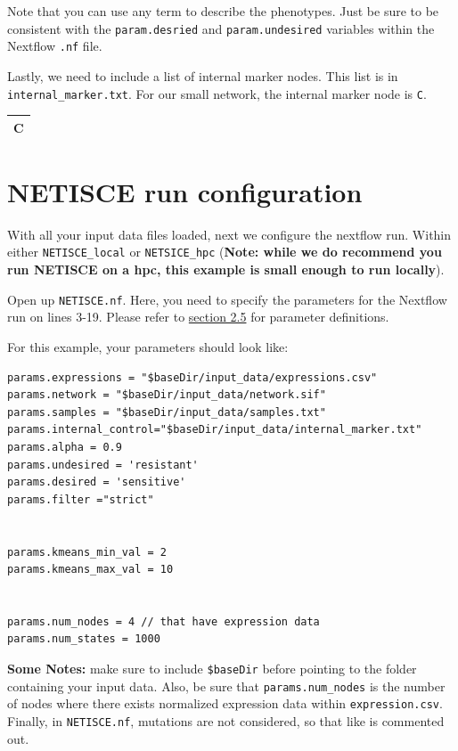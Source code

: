 \documentclass[
]{book}
\begin{document}
Note that you can use any term to describe the phenotypes. Just be sure to be consistent with the \texttt{param.desried} and \texttt{param.undesired} variables within the Nextflow \texttt{.nf} file.

Lastly, we need to include a list of internal marker nodes. This list is in \texttt{internal\_marker.txt}. For our small network, the internal marker node is \texttt{C}.

\begin{tabular}{l}
\hline
C\\


\hline
\end{tabular}

\hypertarget{netisce-run-configuration}{%
\section{NETISCE run configuration}\label{netisce-run-configuration}}

With all your input data files loaded, next we configure the nextflow run.
Within either \texttt{NETISCE\_local} or \texttt{NETSICE\_hpc} (\textbf{Note: while we do recommend you run NETISCE on a hpc, this example is small enough to run locally}).

Open up \texttt{NETISCE.nf}. Here, you need to specify the parameters for the Nextflow run on lines 3-19. Please refer to \protect\hyperlink{params}{section 2.5} for parameter definitions.

For this example, your parameters should look like:

\begin{verbatim}
params.expressions = "$baseDir/input_data/expressions.csv"
params.network = "$baseDir/input_data/network.sif"
params.samples = "$baseDir/input_data/samples.txt"
params.internal_control="$baseDir/input_data/internal_marker.txt"
params.alpha = 0.9
params.undesired = 'resistant'
params.desired = 'sensitive'
params.filter ="strict"


params.kmeans_min_val = 2
params.kmeans_max_val = 10


params.num_nodes = 4 // that have expression data
params.num_states = 1000
\end{verbatim}

\textbf{Some Notes: } make sure to include \texttt{\$baseDir} before pointing to the folder containing your input data. Also, be sure that \texttt{params.num\_nodes} is the number of nodes where there exists normalized expression data within \texttt{expression.csv}. Finally, in \texttt{NETISCE.nf}, mutations are not considered, so that like is commented out.
\end{document}
